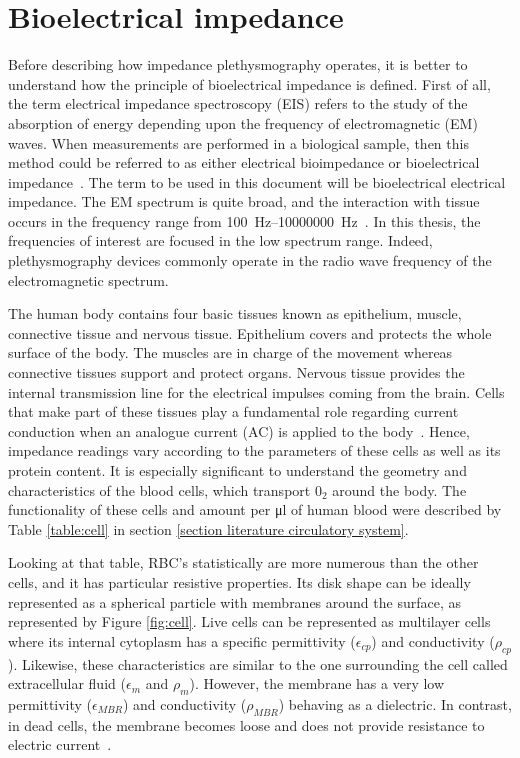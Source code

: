 \section{Bioelectrical impedance}
\label{section impedance BI}
Before describing how impedance plethysmography operates, it is better to understand how the principle of bioelectrical impedance is defined. First of all, the term electrical impedance spectroscopy (EIS) refers to the study of the absorption of energy depending upon the frequency of electromagnetic (EM) waves. When measurements are performed in a biological sample, then this method could be referred to as either electrical bioimpedance or bioelectrical impedance~\cite{ivorra2003bioimpedance}. The term to be used in this document will be bioelectrical electrical impedance. The EM spectrum is quite broad, and the interaction with tissue occurs in the frequency range from \SIrange[scientific-notation = engineering]{100}{10000000}{\hertz}~\cite{bertemes2002tissue}. In this thesis, the frequencies of interest are focused in the low spectrum range. Indeed, plethysmography devices commonly operate in the radio wave frequency of the electromagnetic spectrum.

The human body contains four basic tissues known as epithelium, muscle, connective tissue and nervous tissue. Epithelium covers and protects the whole surface of the body. The muscles are in charge of the movement whereas connective tissues support and protect organs. Nervous tissue provides the internal transmission line for the electrical impulses coming from the brain. Cells that make part of these tissues play a fundamental role regarding current conduction when an analogue current (AC) is applied to the body~\cite{lvovich2012impedance}. Hence, impedance readings vary according to the parameters of these cells as well as its protein content. It is especially significant to understand the geometry and characteristics of the blood cells, which transport $0_2$ around the body. The functionality of these cells and amount per \si{\micro\litre} of human blood were described by Table \ref{table:cell} in section \ref{section literature circulatory system}.

Looking at that table, RBC's statistically are more numerous than the other cells, and it has particular resistive properties. Its disk shape can be ideally represented as a spherical particle with membranes around the surface, as represented by Figure \ref{fig:cell}. Live cells can be represented as multilayer cells where its internal cytoplasm has a specific permittivity ($\epsilon_{cp}$) and conductivity ($\rho_{cp}$). Likewise, these characteristics are similar to the one surrounding the cell called extracellular fluid ($\epsilon_m$ and $\rho_m$). However, the membrane has a very low permittivity ($\epsilon_{MBR}$) and conductivity ($\rho_{MBR}$) behaving as a dielectric. In contrast, in dead cells, the membrane becomes loose and does not provide resistance to electric current~\cite{lvovich2012impedance}.

